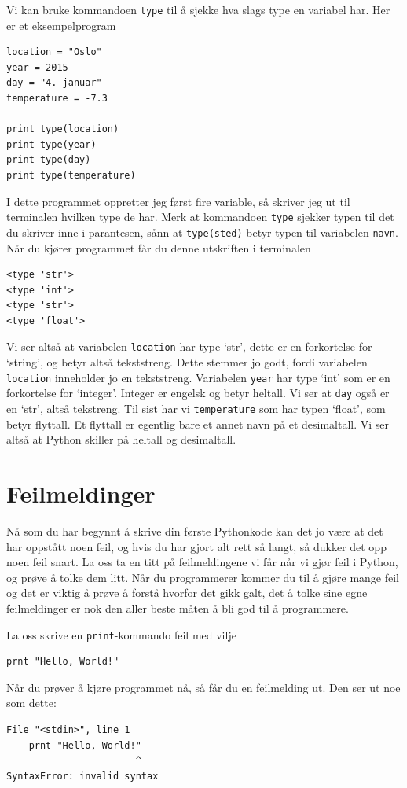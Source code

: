 \documentclass[a4paper, 11pt, notitlepage]{article}
\begin{document}
Vi kan bruke kommandoen \verb+type+ til å sjekke hva slags type en variabel har. Her er et eksempelprogram
\begin{lstlisting}
location = "Oslo"
year = 2015
day = "4. januar"
temperature = -7.3

print type(location)
print type(year)
print type(day)
print type(temperature)
\end{lstlisting}
I dette programmet oppretter jeg først fire variable, så skriver jeg ut til terminalen hvilken type de har. Merk at kommandoen \verb+type+ sjekker typen til det du skriver inne i parantesen, sånn at \verb+type(sted)+ betyr typen til variabelen \verb+navn+. Når du kjører programmet får du denne utskriften i terminalen
\begin{lstlisting}
<type 'str'>
<type 'int'>
<type 'str'>
<type 'float'>
\end{lstlisting}
Vi ser altså at variabelen \verb+location+ har type `str', dette er en forkortelse for `string', og betyr altså tekststreng. Dette stemmer jo godt, fordi variabelen \verb+location+ inneholder jo en tekststreng. Variabelen \verb+year+ har type `int' som er en forkortelse for `integer'. Integer er engelsk og betyr heltall. Vi ser at \verb+day+ også er en `str', altså tekstreng. Til sist har vi \verb+temperature+ som har typen `float', som betyr flyttall. Et flyttall er egentlig bare et annet navn på et desimaltall. Vi ser altså at Python skiller på heltall og desimaltall.

\section*{Feilmeldinger}

Nå som du har begynnt å skrive din første Pythonkode kan det jo være at det har oppstått noen feil, og hvis du har gjort alt rett så langt, så dukker det opp noen feil snart. La oss ta en titt på feilmeldingene vi får når vi gjør feil i Python, og prøve å tolke dem litt. Når du programmerer kommer du til å gjøre mange feil og det er viktig å prøve å forstå hvorfor det gikk galt, det å tolke sine egne feilmeldinger er nok den aller beste måten å bli god til å programmere.

La oss skrive en \verb+print+-kommando feil med vilje
\begin{lstlisting}
prnt "Hello, World!"
\end{lstlisting}
Når du prøver å kjøre programmet nå, så får du en feilmelding ut. Den ser ut noe som dette:
\begin{verbatim}
File "<stdin>", line 1
    prnt "Hello, World!"
                       ^
SyntaxError: invalid syntax
\end{verbatim}
\end{document}
